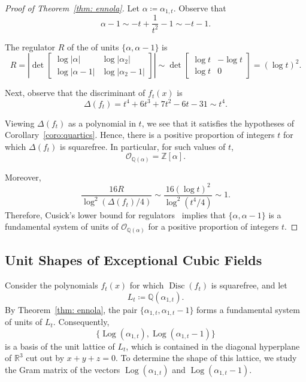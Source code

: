 \documentclass[11pt]{amsart}
\numberwithin{equation}{section}
\theoremstyle{definition}
\newcommand{\RR}{\mathbb{R}}
\DeclareMathOperator{\Log}{Log}
\begin{document}
\begin{proof}[Proof of Theorem~\ref{thm: ennola}]
        Let $\alpha\coloneqq \alpha_{1,t}$. Observe that
        \[
            \alpha-1 \sim -t+\frac{1}{t^2}-1 \sim -t-1.
        \]
    
    The regulator $R$ of the of units $\{\alpha,\alpha-1\}$ is
        \[
            R = \left|\det
            \begin{bmatrix}
                \log|\alpha| & \log|\alpha_2| \\
                \log|\alpha-1| & \log|\alpha_2-1|
            \end{bmatrix}
            \right|
            \sim
            \det
            \begin{bmatrix}
                \log t & -\log t \\
                \log t & 0
            \end{bmatrix}
            =
            (\log t)^2.
        \]
    
    Next, observe that the discriminant of $f_t(x)$ is
        \[
            \Delta(f_t) = t^4 + 6t^3 + 7t^2 - 6t - 31 \sim t^4.
        \]
    
    Viewing $\Delta(f_t)$ as a polynomial in $t$, we see that it satisfies the hypotheses of Corollary~\ref{coro:quartics}. Hence, there is a positive proportion of integers $t$ for which $\Delta(f_t)$ is squarefree. In particular, for such values of $t$,
        \[
            \mathcal{O}_{\mathbb{Q}(\alpha)}  = \mathbb{Z}[\alpha].
        \]
    
    Moreover,
        \[
            \frac{16R}{\log^2(\Delta(f_t)/4)} \sim \frac{16(\log t)^2}{\log^2(t^4/4)} \sim 1.
        \]
    Therefore, Cusick's lower bound for regulators~\cite{cusick-1} implies that $\{\alpha,\alpha-1\}$ is a fundamental system of units of $\mathcal{O}_{\mathbb{Q}(\alpha)}$ for a positive proportion of integers $t$.
\end{proof}


\subsection{Unit Shapes of Exceptional Cubic Fields}

Consider the polynomials $f_t(x)$ for which $\operatorname{Disc}(f_t)$ is squarefree, and let
    \[
        L_t\coloneqq\mathbb{Q}(\alpha_{1,t}).
    \]
By Theorem~\ref{thm: ennola}, the pair $\{\alpha_{1,t},\alpha_{1,t}-1\}$ forms a fundamental system of units of $L_t$. Consequently,
    \[
        \{\Log(\alpha_{1,t}),\Log(\alpha_{1,t}-1)\}
    \]
is a basis of the unit lattice of $L_t$, which is contained in the diagonal hyperplane of $\RR^3$ cut out by $x + y + z =0$. To determine the shape of this lattice, we study the Gram matrix of the vectors $\Log(\alpha_{1,t})$ and $\Log(\alpha_{1,t}-1)$. 
\end{document}
